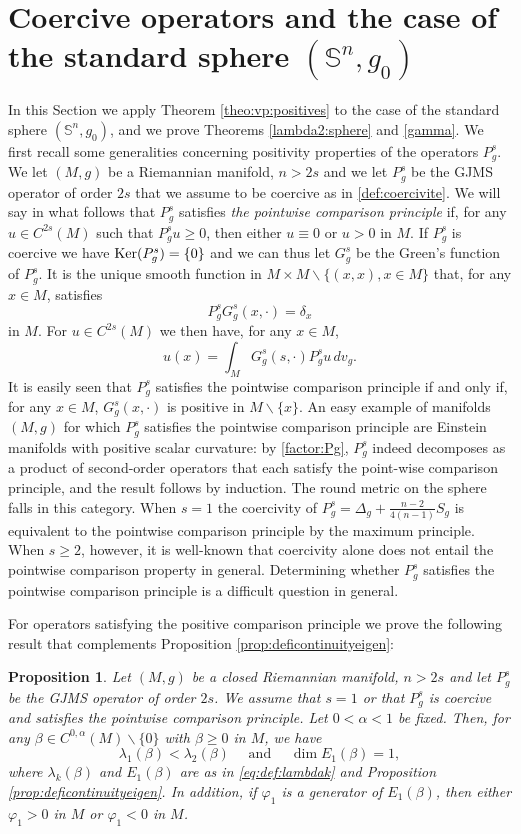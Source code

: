 \documentclass[10pt]{amsart}
\numberwithin{equation}{section}
\def\ker{{\mathop{\rm Ker}}}
\newcommand{\vp}{\varphi}
\theoremstyle{plain}
\newtheorem{prop}[theo]{Proposition}%
\theoremstyle{remark}
\begin{document}
\section{Coercive operators and the case of the standard sphere $(\mathbb{S}^n, g_0)$ }  \label{sec:vpsphere}


In this Section we apply Theorem \ref{theo:vp:positives} to the case of the standard sphere $(\mathbb{S}^n, g_0)$, and we prove Theorems \ref{lambda2:sphere} and \ref{gamma}. We first recall some generalities concerning positivity properties of the operators $P_g^s$. We let $(M,g)$ be a Riemannian manifold, $n >2s$ and we let $P_g^s$ be the GJMS operator of order $2s$ that we assume to be coercive as in \eqref{def:coercivite}. We will say in what follows that $P_g^s$ satisfies \emph{the pointwise comparison principle} if, for any $u \in C^{2s}(M)$ such that $P_g^s u \ge 0$, then either $u\equiv 0$ or $u >0$ in $M$. If $P_g^s$ is coercive we have $\ker (P_g^s) = \{0\}$ and we can thus let $G_g^s$ be the Green's function of $P_g^s$. It is the unique smooth function in $M \times M \backslash \{ (x,x), x \in M\}$ that, for any $x \in M$,  satisfies 
 $$ P_g^s G_g^s(x, \cdot) = \delta_x$$
 in $M$.  For $u \in C^{2s}(M)$ we then have, for any $x \in M$,
  $$ u(x) = \int_M G_g^s(s,\cdot) P_g^su \, dv_g. $$
It is easily seen that $P_g^s$ satisfies the pointwise comparison principle if and only if, for any $x \in M$, $G_g^s(x, \cdot)$ is positive in $M \backslash \{x\}$. An easy example of manifolds $(M,g)$ for which $P_g^s$ satisfies the pointwise comparison principle are Einstein manifolds with positive scalar curvature: by \eqref{factor:Pg}, $P_g^s$ indeed decomposes as a product of second-order operators that each satisfy the point-wise comparison principle, and the result follows by induction. The round metric on the sphere falls in this category. When $s=1$ the coercivity of $P_g^s = \Delta_g + \frac{n-2}{4(n-1)}S_g$ is equivalent to the pointwise comparison principle by the maximum principle. When $s \ge 2$, however, it is well-known that coercivity alone does not entail the pointwise comparison property in general. Determining whether $P_g^s$ satisfies the pointwise comparison principle is a difficult question in general.
 
  For operators satisfying the positive comparison principle we prove the following result that complements Proposition \ref{prop:deficontinuityeigen}:
\begin{prop} \label{prop:vp1:simple}
Let $(M,g)$ be a closed Riemannian manifold, $n >2s$ and let $P_g^s$ be the GJMS operator of order $2s$. We assume that $s=1$ or that $P_g^s$ is coercive and satisfies the pointwise comparison principle. Let $0< \alpha <1$ be fixed. Then, for any  $\beta \in C^{0,\alpha}(M) \backslash \{0\}$ with $\beta \ge 0$ in $M$, we have 
$$ \lambda_1(\beta) < \lambda_2(\beta) \quad \text{ and } \quad \dim E_1(\beta) = 1,$$
where $ \lambda_k(\beta)$ and $E_1(\beta)$ are as in \eqref{eq:def:lambdak} and Proposition \ref{prop:deficontinuityeigen}. In addition, if $\vp_1$ is a generator of $E_1(\beta)$, then either $\vp_1 >0$ in $M$ or $\vp_1 <0$ in $M$. 
\end{prop}
\end{document}
